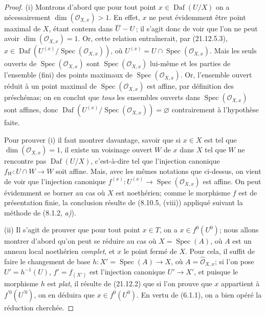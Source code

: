 \begin{proof}
(i) Montrons d'abord que pour tout point $x\in\operatorname{Daf}(U/X)$ on a
nécessairement $\dim(\mathcal O_{X,x})>1$. En effet, $x$ ne peut évidemment être point
maximal de $X$, étant contenu dans $\overline U- U$; il s'agit donc de voir que l'on ne
peut avoir $\dim(\mathcal O_{X,x})=1$. Or, cette relation entraînerait, par (21.12.5.3),
$x\in\operatorname{Daf}(U^{(x)}/\operatorname{Spec}(\mathcal O_{X,x}))$, où
$U^{(x)}=U\cap\operatorname{Spec}(\mathcal O_{X,x})$. Mais les seuls ouverts de
$\operatorname{Spec}(\mathcal O_{X,x})$ sont $\operatorname{Spec}(\mathcal O_{X,x})$
lui-même et les parties de l'ensemble (fini) des points maximaux de
$\operatorname{Spec}(\mathcal O_{X,x})$. Or, l'ensemble ouvert réduit à un point maximal
de $\operatorname{Spec}(\mathcal O_{X,x})$ est affine, par définition des préschémas; on
en conclut que \emph{tous} les ensembles ouverts dans
$\operatorname{Spec}(\mathcal O_{X,x})$ sont affines, donc
$\operatorname{Daf}(U^{(x)}/\operatorname{Spec}(\mathcal O_{X,x}))=\varnothing$
contrairement à l'hypothèse faite.

Pour prouver (i) il faut montrer davantage, savoir que si $x\in X$ est tel que
$\dim(\mathcal O_{X,x})=1$, il existe un voisinage ouvert $W$ de $x$ dans $X$ tel que
$W$ ne rencontre pas $\operatorname{Daf}(U/X)$, c'est-à-dire tel que l'injection
canonique $f_W:U\cap W\to W$ soit affine. Mais, avec les mêmes notations que ci-dessus,
on vient de voir que l'injection canonique
$f^{(x)}:U^{(x)}\to\operatorname{Spec}(\mathcal O_{X,x})$ est affine. On peut
évidemment se borner au cas où $X$ est noethérien; comme le morphisme $f$ est de
présentation finie, la conclusion résulte de (8.10.5, (viii)) appliqué suivant la
méthode de (8.1.2, \emph{a)}).

(ii) Il s'agit de prouver que pour tout point $x\in T$, on a $x\in f^0(U^0)$; nous
allons montrer d'abord qu'on peut se réduire au cas où $X=\operatorname{Spec}(A)$, où
$A$ est un anneau local noethérien \emph{complet}, et $x$ le point fermé de $X$. Pour
cela, il suffit de faire le changement de base
$h:X'=\operatorname{Spec}(A)\to X$, où $A=\widehat{\mathcal O}_{X,x}$; si l'on pose
$U'=h^{-1}(U)$, $f'=f_{(X')}$ est l'injection canonique $U'\to X'$, et puisque le
morphisme $h$ est \emph{plat}, il résulte de (21.12.2) que si l'on prouve que $x$ appartient à
$f^{\prime 0}(U^{\prime 0})$, on en déduira que $x\in f^0(U^0)$. En vertu de (6.1.1), on a
bien opéré la réduction cherchée.


\end{proof}
